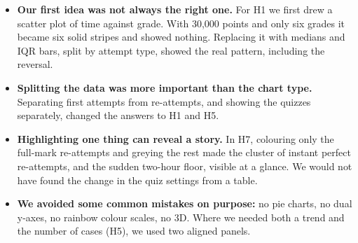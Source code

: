 \begin{itemize}
  \item \textbf{Our first idea was not always the right one.} For H1 we first
        drew a scatter plot of time against grade. With 30,000 points and only
        six grades it became six solid stripes and showed nothing. Replacing it
        with medians and IQR bars, split by attempt type, showed the real
        pattern, including the reversal.
  \item \textbf{Splitting the data was more important than the chart type.}
        Separating first attempts from re-attempts, and showing the quizzes
        separately, changed the answers to H1 and H5.
  \item \textbf{Highlighting one thing can reveal a story.} In H7, colouring
        only the full-mark re-attempts and greying the rest made the cluster of
        instant perfect re-attempts, and the sudden two-hour floor, visible at a
        glance. We would not have found the change in the quiz settings from a
        table.
  \item \textbf{We avoided some common mistakes on purpose:} no pie charts, no
        dual y-axes, no rainbow colour scales, no 3D. Where we needed both a
        trend and the number of cases (H5), we used two aligned panels.
\end{itemize}

